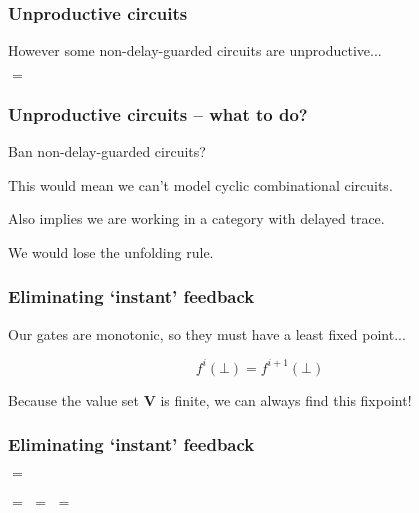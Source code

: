 \begin{frame}
    \frametitle{Unproductive circuits}

    However some non-delay-guarded circuits \alert{are} unproductive...

    \begin{center}
        \pause
        \pause
        \quad$=$\quad

    \end{center}

\end{frame}

\begin{frame}
    \frametitle{Unproductive circuits -- what to do?}

    Ban non-delay-guarded circuits?

    \pause

    This would mean we can't model cyclic combinational circuits.

    \pause

    Also implies we are working in a category with \alert{delayed trace}.
    
    \pause

    We would lose the \alert{unfolding} rule.

\end{frame}

\begin{frame}
    \frametitle{Eliminating `instant' feedback}

    \pause

    Our gates are \alert{monotonic}, so they must have a \alert{least fixed point}...
    
    \[f^i(\bot) = f^{i+1}(\bot)\]

    \pause

    Because the value set $\textbf{V}$ is finite, we can always find this fixpoint!    
    
\end{frame}

\begin{frame}
    \frametitle{Eliminating `instant' feedback}

    
    \begin{center}
        \pause
        \quad$=$\quad

        \vspace{1em}

        \pause
        \quad$=$\quad
        \pause
        \quad$=$\quad
        \pause
        \quad$=$\quad
    \end{center}


\end{frame}


